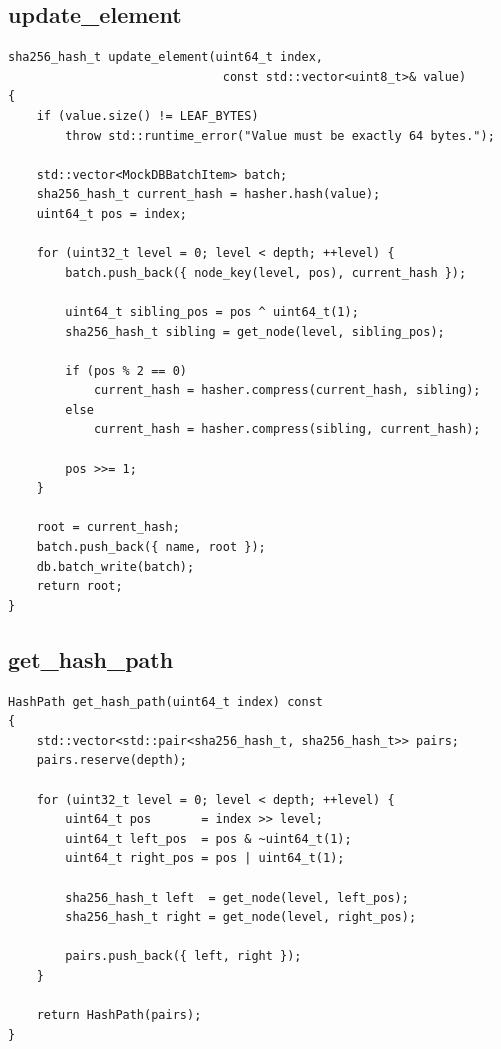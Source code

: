 \documentclass[12pt,a4paper]{article}
\begin{document}
\subsection{update\_element}

\begin{lstlisting}[style=cppcode, caption={C++ update\_element — path traversal with batch write}]
sha256_hash_t update_element(uint64_t index,
                              const std::vector<uint8_t>& value)
{
    if (value.size() != LEAF_BYTES)
        throw std::runtime_error("Value must be exactly 64 bytes.");

    std::vector<MockDBBatchItem> batch;
    sha256_hash_t current_hash = hasher.hash(value);
    uint64_t pos = index;

    for (uint32_t level = 0; level < depth; ++level) {
        batch.push_back({ node_key(level, pos), current_hash });

        uint64_t sibling_pos = pos ^ uint64_t(1);
        sha256_hash_t sibling = get_node(level, sibling_pos);

        if (pos % 2 == 0)
            current_hash = hasher.compress(current_hash, sibling);
        else
            current_hash = hasher.compress(sibling, current_hash);

        pos >>= 1;
    }

    root = current_hash;
    batch.push_back({ name, root });
    db.batch_write(batch);
    return root;
}
\end{lstlisting}

\subsection{get\_hash\_path}

\begin{lstlisting}[style=cppcode, caption={C++ get\_hash\_path — returning sibling pairs as HashPath}]
HashPath get_hash_path(uint64_t index) const
{
    std::vector<std::pair<sha256_hash_t, sha256_hash_t>> pairs;
    pairs.reserve(depth);

    for (uint32_t level = 0; level < depth; ++level) {
        uint64_t pos       = index >> level;
        uint64_t left_pos  = pos & ~uint64_t(1);
        uint64_t right_pos = pos | uint64_t(1);

        sha256_hash_t left  = get_node(level, left_pos);
        sha256_hash_t right = get_node(level, right_pos);

        pairs.push_back({ left, right });
    }

    return HashPath(pairs);
}
\end{lstlisting}
\end{document}
